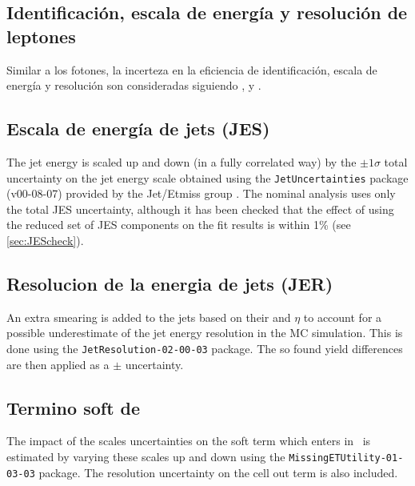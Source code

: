 


\subsection{Identificación, escala de energía y resolución de leptones}\label{sec:syst_leptonid}

Similar a los fotones, la incerteza en la eficiencia de identificación, escala de
energía y resolución son consideradas siguiendo \cite{EleEffTwiki}, \cite{EGScaleTwiki}
y \cite{MCPTwiki}.

\subsection{Escala de energía de jets (JES)}
The jet energy is scaled up and down (in a fully correlated way) by the $\pm1\sigma$ total uncertainty on the jet energy scale obtained
using the {\small \texttt{JetUncertainties}} package (v00-08-07) provided by the Jet/Etmiss group \cite{JesTwiki}. The nominal analysis
uses only the total JES uncertainty, although it has been checked that the effect of using the reduced set of JES components on the fit
results is within 1\% (see \cref{sec:JEScheck}).

\subsection{Resolucion de la energia de jets (JER)}
 An extra \pt smearing is added to the jets based on their \pt and $\eta$ to account
for a possible underestimate of the jet energy resolution in the MC simulation. This is done using the
\texttt{JetResolution-02-00-03} package. The so found yield differences are then applied as a $\pm$ uncertainty.

\subsection{Termino soft de \MET}
The impact of the scales uncertainties on the soft term which enters in \MET\ is estimated by varying these
scales up and down using the \texttt{MissingETUtility-01-03-03} package. The resolution uncertainty on the cell out term is also included.

